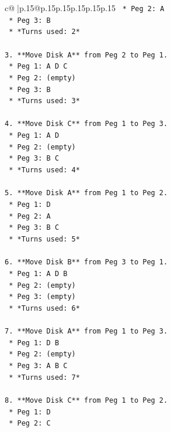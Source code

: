 \documentclass{article}
\begin{document}
{\begin{supertabular}{c@{$\;$}|p{.15\linewidth}@{}p{.15\linewidth}p{.15\linewidth}p{.15\linewidth}p{.15\linewidth}p{.15\linewidth}}
{{{\texttt{    *   Peg 2: A} \\
\texttt{    *   Peg 3: B} \\
\texttt{    *   *Turns used: 2*} \\
\\ 
\texttt{3.  **Move Disk A** from Peg 2 to Peg 1.} \\
\texttt{    *   Peg 1: A D C} \\
\texttt{    *   Peg 2: (empty)} \\
\texttt{    *   Peg 3: B} \\
\texttt{    *   *Turns used: 3*} \\
\\ 
\texttt{4.  **Move Disk C** from Peg 1 to Peg 3.} \\
\texttt{    *   Peg 1: A D} \\
\texttt{    *   Peg 2: (empty)} \\
\texttt{    *   Peg 3: B C} \\
\texttt{    *   *Turns used: 4*} \\
\\ 
\texttt{5.  **Move Disk A** from Peg 1 to Peg 2.} \\
\texttt{    *   Peg 1: D} \\
\texttt{    *   Peg 2: A} \\
\texttt{    *   Peg 3: B C} \\
\texttt{    *   *Turns used: 5*} \\
\\ 
\texttt{6.  **Move Disk B** from Peg 3 to Peg 1.} \\
\texttt{    *   Peg 1: A D B} \\
\texttt{    *   Peg 2: (empty)} \\
\texttt{    *   Peg 3: (empty)} \\
\texttt{    *   *Turns used: 6*} \\
\\ 
\texttt{7.  **Move Disk A** from Peg 1 to Peg 3.} \\
\texttt{    *   Peg 1: D B} \\
\texttt{    *   Peg 2: (empty)} \\
\texttt{    *   Peg 3: A B C} \\
\texttt{    *   *Turns used: 7*} \\
\\ 
\texttt{8.  **Move Disk C** from Peg 1 to Peg 2.} \\
\texttt{    *   Peg 1: D} \\
\texttt{    *   Peg 2: C} \\
}}}
\end{supertabular}}
\end{document}
